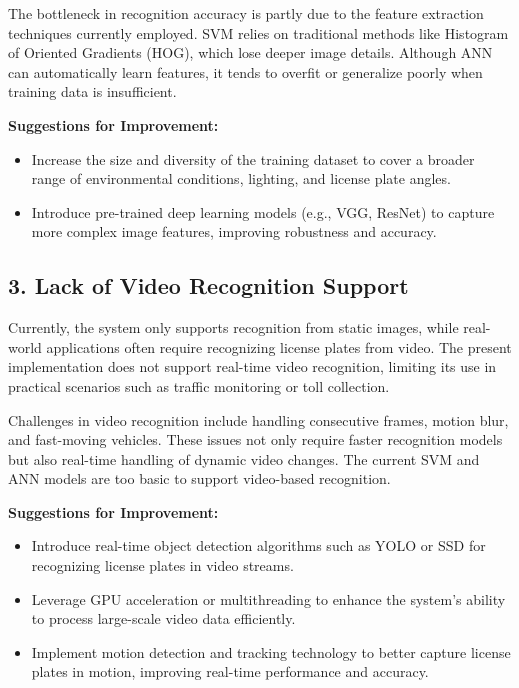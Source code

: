 \documentclass{article}
\begin{document}
	The bottleneck in recognition accuracy is partly due to the feature extraction techniques currently employed. SVM relies on traditional methods like Histogram of Oriented Gradients (HOG), which lose deeper image details. Although ANN can automatically learn features, it tends to overfit or generalize poorly when training data is insufficient.
	
	\textbf{Suggestions for Improvement:}
	\begin{itemize}
		\item Increase the size and diversity of the training dataset to cover a broader range of environmental conditions, lighting, and license plate angles.
		\item Introduce pre-trained deep learning models (e.g., VGG, ResNet) to capture more complex image features, improving robustness and accuracy.
	\end{itemize}
	
	\subsection*{3. Lack of Video Recognition Support}
	
	Currently, the system only supports recognition from static images, while real-world applications often require recognizing license plates from video. The present implementation does not support real-time video recognition, limiting its use in practical scenarios such as traffic monitoring or toll collection.
	
	Challenges in video recognition include handling consecutive frames, motion blur, and fast-moving vehicles. These issues not only require faster recognition models but also real-time handling of dynamic video changes. The current SVM and ANN models are too basic to support video-based recognition.
	
	\textbf{Suggestions for Improvement:}
	\begin{itemize}
		\item Introduce real-time object detection algorithms such as YOLO or SSD for recognizing license plates in video streams.
		\item Leverage GPU acceleration or multithreading to enhance the system's ability to process large-scale video data efficiently.
		\item Implement motion detection and tracking technology to better capture license plates in motion, improving real-time performance and accuracy.
	\end{itemize}
	
\end{document}
